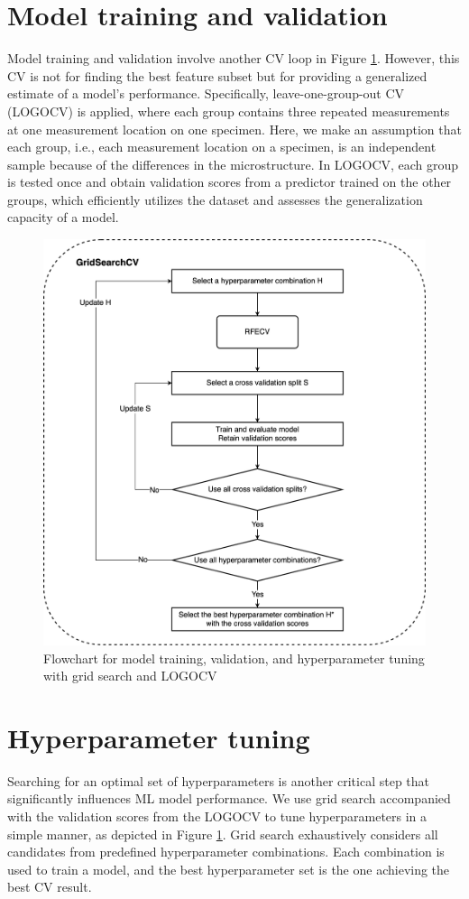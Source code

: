 \section{Model training and validation}
\label{sec: model train and val}
Model training and validation involve another CV loop in Figure \ref{fig: logocv}. However, this CV is not for finding the best feature subset but for providing a generalized estimate of a model's performance. Specifically, leave-one-group-out CV (LOGOCV) \cite{LOGOCV-Saeb059774} is applied, where each group contains three repeated measurements at one measurement location on one specimen. Here, we make an assumption that each group, i.e., each measurement location on a specimen, is an independent sample because of the differences in the microstructure. In LOGOCV, each group is tested once and obtain validation scores from a predictor trained on the other groups, which efficiently utilizes the dataset and assesses the generalization capacity of a model.

\begin{figure}[tb]
    \centering
    \includegraphics[width=0.9\linewidth]{fig/logocv.png}
    \caption{Flowchart for model training, validation, and hyperparameter tuning with grid search and LOGOCV}
    \label{fig: logocv}
\end{figure}

\section{Hyperparameter tuning}
Searching for an optimal set of hyperparameters is another critical step that significantly influences ML model performance. We use grid search \cite{hyperparameter-Feurer2019} accompanied with the validation scores from the LOGOCV to tune hyperparameters in a simple manner, as depicted in Figure \ref{fig: logocv}. Grid search exhaustively considers all candidates from predefined hyperparameter combinations. Each combination is used to train a model, and the best hyperparameter set is the one achieving the best CV result. 

